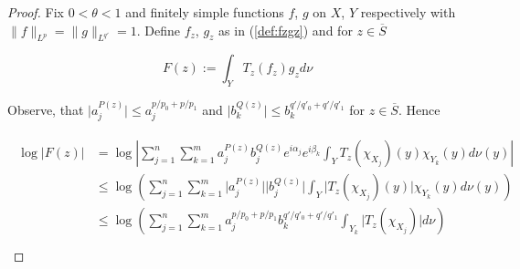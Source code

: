 \begin{proof}
	Fix $0 < \theta < 1$ and finitely simple functions $f$, $g$ on $X$, $Y$ respectively with $\|f\|_{L^p} = \|g\|_{L^{q'}} = 1$. Define $f_z$, $g_z$ as in (\ref{def:fzgz}) and for $z \in \overline{S}$

	\begin{equation}
		F(z) := \int_Y T_z(f_z)g_z d\nu	
	\end{equation}

	Observe, that $\vert a^{P(z)}_j\vert \leqslant a_j^{p/p_0 + p/p_1}$ and $\vert b^{Q(z)}_k\vert \leqslant b_k^{q'/q'_0 + q'/q'_1}$ for $z \in \overline{S}$. Hence

	\begin{gather}
		\begin{aligned}
			\log \vert F(z) \vert &= \log \left\vert \sum_{j = 1}^n\sum_{k = 1}^m a^{P(z)}_j b_j^{Q(z)} e^{i\alpha_j} e^{i\beta_k} \int_YT_z(\chi_{X_j})(y)\chi_{Y_k}(y)d\nu(y)\right\vert\\
			&\leqslant \log \left( \sum_{j = 1}^n\sum_{k = 1}^m \vert a^{P(z)}_j\vert \vert b_j^{Q(z)}\vert \int_Y\vert T_z(\chi_{X_j})(y)\vert \chi_{Y_k}(y)d\nu(y)\right)\\
			&\leqslant  \log \left( \sum_{j = 1}^n\sum_{k = 1}^m a_j^{p/p_0 + p/p_1} b_k^{q'/q'_0 + q'/q'_1} \int_{Y_k}\vert T_z(\chi_{X_j})\vert d\nu\right)\\
		\end{aligned}
	\end{gather}
\end{proof}
